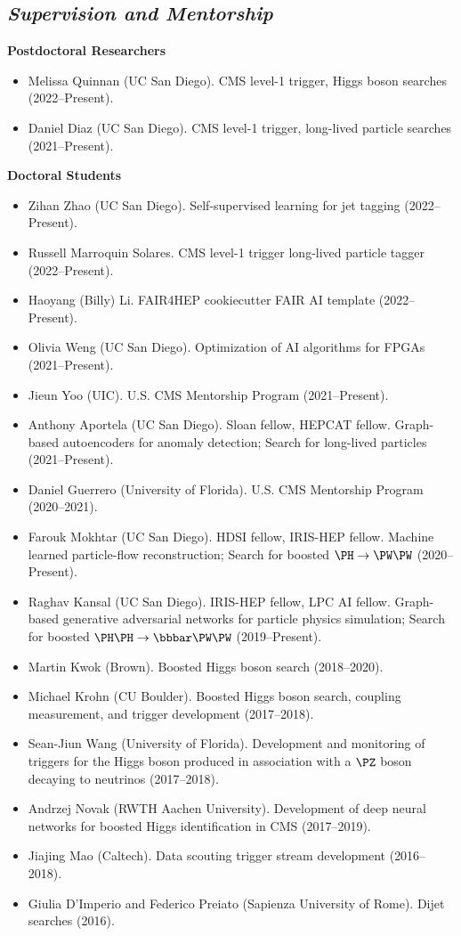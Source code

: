 \documentclass[11pt]{res}
\newcommand{\MarginText}[1]{\section{\textit{#1}}}
\begin{document}
\begin{resume}
  \MarginText{Supervision and Mentorship}

  \textbf{Postdoctoral Researchers}
  \begin{itemize}
    \itemsep-0.3em
    \item Melissa Quinnan (UC San Diego). CMS level-1 trigger, Higgs boson searches ({2022--Present}).
    \item Daniel Diaz (UC San Diego). CMS level-1 trigger, long-lived particle searches ({2021--Present}).
  \end{itemize}

  \textbf{Doctoral Students}
  \begin{itemize}
    \itemsep-0.3em
    \item Zihan Zhao (UC San Diego). Self-supervised learning for jet tagging ({2022--Present}).
    \item Russell Marroquin Solares. CMS level-1 trigger long-lived particle tagger ({2022--Present}).
    \item Haoyang (Billy) Li. FAIR4HEP cookiecutter FAIR AI template ({2022--Present}).
    \item Olivia Weng (UC San Diego). Optimization of AI algorithms for FPGAs ({2021--Present}).
    \item Jieun Yoo (UIC). U.S. CMS Mentorship Program ({2021--Present}).
    \item Anthony Aportela (UC San Diego). Sloan fellow, HEPCAT fellow. Graph-based autoencoders for anomaly detection; Search for long-lived particles ({2021--Present}).
    \item Daniel Guerrero (University of Florida). U.S. CMS Mentorship Program ({2020--2021}).
    \item Farouk Mokhtar (UC San Diego). HDSI fellow, IRIS-HEP fellow. Machine learned particle-flow reconstruction; Search for boosted $\PH\to\PW\PW$ ({2020--Present}).
    \item Raghav Kansal (UC San Diego). IRIS-HEP fellow, LPC AI fellow. Graph-based generative adversarial networks for particle physics simulation; Search for boosted $\PH\PH\to\bbbar\PW\PW$ ({2019--Present}).
    \item Martin Kwok (Brown). Boosted Higgs boson search ({2018--2020}).
    \item Michael Krohn (CU Boulder). Boosted Higgs boson search, coupling measurement, and trigger development ({2017--2018}).
    \item Sean-Jiun Wang (University of Florida). Development and monitoring of triggers for the Higgs boson produced in association with a $\PZ$ boson decaying to neutrinos ({2017--2018}).
    \item Andrzej Novak (RWTH Aachen University). Development of deep neural networks for boosted Higgs identification in CMS ({2017--2019}).
    \item Jiajing Mao (Caltech). Data scouting trigger stream development ({2016--2018}).
    \item Giulia D'Imperio and Federico Preiato (Sapienza University of Rome). Dijet searches ({2016}).
  \end{itemize}


\end{resume}
\end{document}
